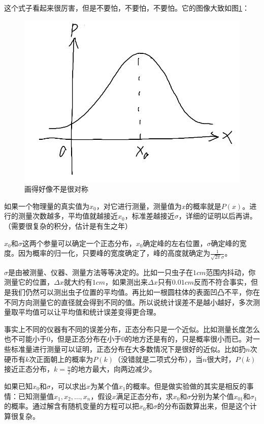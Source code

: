 这个式子看起来很厉害，但是不要怕，不要怕，不要怕。它的图像大致如图\ref{fig-gaussian}：
\begin{figure}[htb]
\centering
\includegraphics[scale=0.5]{fig/gaussian.png}
\caption{画得好像不是很对称}
\label{fig-gaussian}
\end{figure}

如果一个物理量的真实值为$x_0$，对它进行测量，测量值为$x$的概率就是$P(x)$。进行的测量次数越多，平均值就越接近$x_0$，标准差越接近$\sigma$，详细的证明以后再讲。（需要很复杂的积分，估计是有生之年）

$x_0$和$\sigma$这两个参量可以确定一个正态分布，$x_0$确定峰的左右位置，$\sigma$确定峰的宽度。因为概率的归一化，只要峰的宽度确定了，峰的高度就确定为$\frac{1}{\sqrt{2 \pi} \sigma}$。

$\sigma$是由被测量、仪器、测量方法等等决定的。比如一只虫子在$1 \unit{cm}$范围内抖动，你测量它的位置，$\Delta x$就大约有$1 \unit{cm}$，如果测出来$\Delta x$只有$0.01 \unit{cm}$反而不符合事实，但是我们仍然可以测出虫子位置的平均值。再比如一根圆柱体的表面凹凸不平，你在不同方向测量它的直径就会得到不同的值。所以说统计误差不是越小越好，多次测量取平均值可以让平均值和统计误差变得更合理。

事实上不同的仪器有不同的误差分布，正态分布只是一个近似。比如测量长度怎么也不可能小于$0$，但是正态分布在小于$0$的地方还是有的，只是概率很小而已。对一些标准量进行测量可以证明，正态分布在大多数情况下是很好的近似。比如扔$n$次硬币有$k$次正面朝上的概率为$P(k)$（没错就是二项式分布），当$n$很大时，$P(k)$接近正态分布，$k=\frac{n}{2}$的地方最大，向两边减少。

如果已知$x_0$和$\sigma$，可以求出$x$为某个值$x_1$的概率。但是做实验做的其实是相反的事情：已知测量值$x_1,x_2,\dots,x_n$，假设$x$满足正态分布，求$x_0$和$\sigma$分别为某个值$x_{0 1}$和$\sigma_1$的概率。通过解含有随机变量的方程可以把$x_0$和$\sigma$的分布函数算出来，但是这个计算很复杂。

